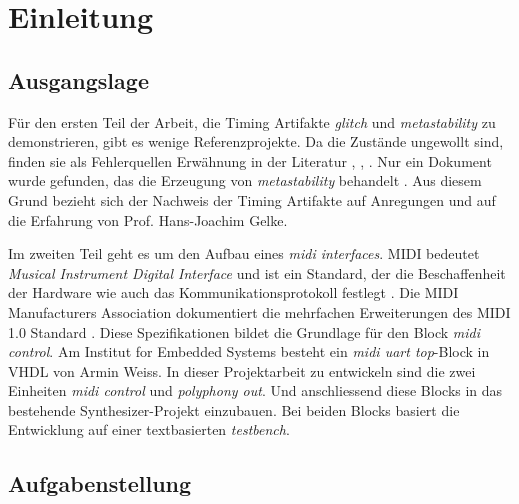 
\chapter{Einleitung}\label{chap.einleitung}

\section{Ausgangslage}\label{sect.einleitung_ausgangslage}

Für den ersten Teil der Arbeit, die Timing Artifakte  \textit{glitch} und \textit{metastability} zu demonstrieren, gibt es wenige Referenzprojekte. Da die Zustände ungewollt sind, finden sie als Fehlerquellen Erwähnung in der Literatur \citep{ReferenceManual}, \citep{F_glitches}, \citep{F_metastability}. Nur ein Dokument wurde gefunden, das die Erzeugung von \textit{metastability} behandelt \citep{Metastabil}. Aus diesem Grund bezieht sich der Nachweis der Timing Artifakte auf Anregungen und auf die Erfahrung von Prof. Hans-Joachim Gelke.

Im zweiten Teil geht es um den Aufbau eines \textit{midi interfaces}. MIDI bedeutet \textit{Musical Instrument Digital Interface} und ist ein Standard, der die Beschaffenheit der Hardware wie auch das Kommunikationsprotokoll festlegt \citep{Midi_Braut}. Die MIDI Manufacturers Association dokumentiert die mehrfachen Erweiterungen des MIDI 1.0 Standard \citep{Midi_specification}. Diese Spezifikationen bildet die Grundlage für den Block \textit{midi control}. Am Institut for Embedded Systems besteht ein \textit{midi uart top}-Block in VHDL von Armin Weiss. In dieser Projektarbeit zu entwickeln sind die zwei Einheiten \textit{midi control}  und \textit{polyphony out}. Und anschliessend diese Blocks in das bestehende Synthesizer-Projekt einzubauen. Bei beiden Blocks basiert die Entwicklung auf einer textbasierten \textit{testbench}.

\section{Aufgabenstellung}\label{sect.einleitung_ziele}

